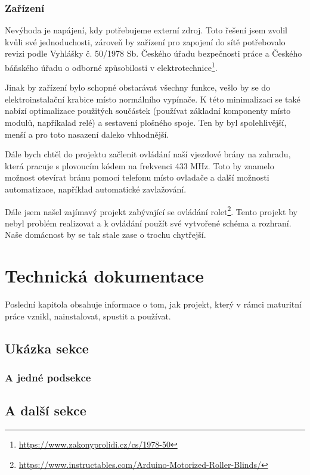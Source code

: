 \documentclass[11pt,a4paper,twoside,openright]{report}
\begin{document}
	
	\subsection{Zařízení}
	Nevýhoda  je napájení, kdy potřebujeme externí zdroj. Toto řešení jsem zvolil kvůli své jednoduchosti, zároveň by zařízení pro zapojení do sítě potřebovalo revizi podle Vyhlášky č. 50/1978 Sb. Českého úřadu bezpečnosti práce a Českého báňského úřadu o odborné způsobilosti v elektrotechnice\footnote{\url{https://www.zakonyprolidi.cz/cs/1978-50}}. 
	
	
	Jinak by zařízení bylo schopné obstarávat všechny funkce, vešlo by se do elektroinstalační krabice místo normálního vypínače. K této minimalizaci se také nabízí optimalizace použitých součástek (používat základní komponenty místo modulů, napříkalad relé) a sestavení plošného spoje. Ten by byl spolehlivější, menší a pro toto nasazení daleko vhhodnější.
	
	
	Dále bych chtěl do projektu začlenit ovládání naší vjezdové brány na zahradu, která pracuje s plovoucím kódem na frekvenci 433 MHz. Toto by znamelo možnost otevírat bránu pomocí telefonu místo ovladače a další možnosti automatizace, například automatické zavlažování.
	
	
	Dále jsem našel zajímavý projekt zabývající se ovládání rolet\footnote{\url{https://www.instructables.com/Arduino-Motorized-Roller-Blinds/}}. Tento projekt by nebyl problém realizovat a k ovládání použít své vytvořené schéma a rozhraní. Naše domácnost by se tak stale zase o trochu chytřejší.
	
	\chapter{Technická dokumentace}
	
	Poslední kapitola obsahuje informace o tom, jak projekt, který v rámci maturitní práce vznikl, nainstalovat, spustit a používat.
	
	\section{Ukázka sekce}
	
	
	\subsection{A jedné podsekce}
	
	
	\section{A další sekce}
	
\end{document}
